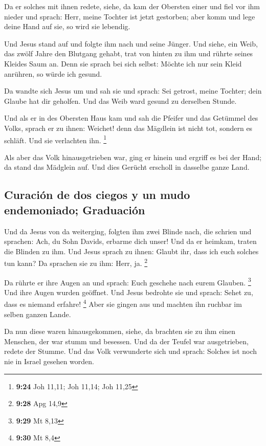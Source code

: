  Da er solches mit ihnen redete, siehe, da kam der
Obersten einer und fiel vor ihm nieder und sprach: Herr, meine Tochter
ist jetzt gestorben; aber komm und lege deine Hand auf sie, so wird sie
lebendig.

 Und Jesus stand auf und folgte ihm nach und seine
Jünger.  Und siehe, ein Weib, das zwölf Jahre den
Blutgang gehabt, trat von hinten zu ihm und rührte seines Kleides Saum
an.  Denn sie sprach bei sich selbst: Möchte ich nur sein
Kleid anrühren, so würde ich gesund.

 Da wandte sich Jesus um und sah sie und sprach: Sei
getrost, meine Tochter; dein Glaube hat dir geholfen. Und das Weib ward
gesund zu derselben Stunde.

 Und als er in des Obersten Haus kam und sah die Pfeifer
und das Getümmel des Volks,  sprach er zu ihnen: Weichet!
denn das Mägdlein ist nicht tot, sondern es schläft. Und sie verlachten
ihn. \footnote{\textbf{9:24} Joh 11,11; Joh 11,14; Joh 11,25}

 Als aber das Volk hinausgetrieben war, ging er hinein
und ergriff es bei der Hand; da stand das Mädglein auf. 
Und dies Gerücht erscholl in dasselbe ganze Land.

\hypertarget{curaciuxf3n-de-dos-ciegos-y-un-mudo-endemoniado-graduaciuxf3n}{%
\subsection{Curación de dos ciegos y un mudo endemoniado;
Graduación}\label{curaciuxf3n-de-dos-ciegos-y-un-mudo-endemoniado-graduaciuxf3n}}

 Und da Jesus von da weiterging, folgten ihm zwei Blinde
nach, die schrien und sprachen: Ach, du Sohn Davids, erbarme dich unser!
 Und da er heimkam, traten die Blinden zu ihm. Und Jesus
sprach zu ihnen: Glaubt ihr, dass ich euch solches tun kann? Da sprachen
sie zu ihm: Herr, ja. \footnote{\textbf{9:28} Apg 14,9}

 Da rührte er ihre Augen an und sprach: Euch geschehe
nach eurem Glauben. \footnote{\textbf{9:29} Mt 8,13}  Und
ihre Augen wurden geöffnet. Und Jesus bedrohte sie und sprach: Sehet zu,
dass es niemand erfahre! \footnote{\textbf{9:30} Mt 8,4} 
Aber sie gingen aus und machten ihn ruchbar im selben ganzen Lande.

 Da nun diese waren hinausgekommen, siehe, da brachten
sie zu ihm einen Menschen, der war stumm und besessen. 
Und da der Teufel war ausgetrieben, redete der Stumme. Und das Volk
verwunderte sich und sprach: Solches ist noch nie in Israel gesehen
worden.

